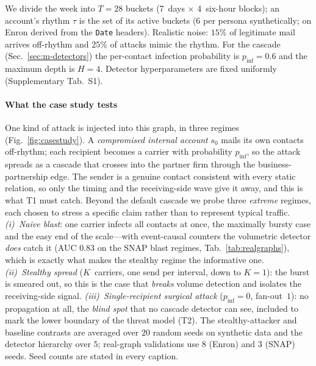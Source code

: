 We divide the week into $T{=}28$ buckets (7~days $\times$ 4~six-hour blocks); an account's rhythm $\tau$ is the
set of its active buckets ($6$ per persona synthetically; on Enron derived from the \texttt{Date} headers).
Realistic noise: $15\%$ of legitimate mail arrives off-rhythm and $25\%$ of attacks mimic the rhythm. For the
cascade (Sec.~\ref{sec:m-detectors}) the per-contact infection probability is $p_\mathrm{inf}{=}0.6$ and the
maximum depth is $H{=}4$. Detector hyperparameters are fixed uniformly (Supplementary Tab.~S1).

\paragraph{What the case study tests} One kind of attack is injected into this graph, in three regimes
(Fig.~\ref{fig:casestudy}). A \emph{compromised internal account} $s_0$ mails its own contacts off-rhythm;
each recipient becomes a carrier with probability $p_\mathrm{inf}$, so the attack spreads as a cascade that
crosses into the partner firm through the business-partnership edge. The sender is a genuine contact
consistent with every static relation, so only the timing and the receiving-side wave give it away, and this
is what T1 must catch. Beyond the default cascade we probe three \emph{extreme} regimes, each chosen to stress
a specific claim rather than to represent typical traffic. \emph{(i)~Naive blast}: one carrier infects all
contacts at once, the maximally bursty case and the easy end of the scale---with event-causal counters the
volumetric detector \emph{does} catch it (AUC $0.83$ on the SNAP blast regimes, Tab.~\ref{tab:realgraphs}),
which is exactly what makes the stealthy regime the informative one.
\emph{(ii)~Stealthy spread} ($K$~carriers, one send per interval, down to $K{=}1$): the burst is smeared out,
so this is the case that \emph{breaks} volume detection and isolates the receiving-side signal.
\emph{(iii)~Single-recipient surgical attack} ($p_\mathrm{inf}{=}0$, fan-out~$1$): no propagation at all,
the \emph{blind spot} that no cascade detector can see, included to mark the lower boundary of the threat
model (T2). The stealthy-attacker and baseline contrasts are averaged over $20$ random seeds on synthetic
data and the detector hierarchy over $5$; real-graph validations use $8$ (Enron) and $3$ (SNAP) seeds.
Seed counts are stated in every caption.

